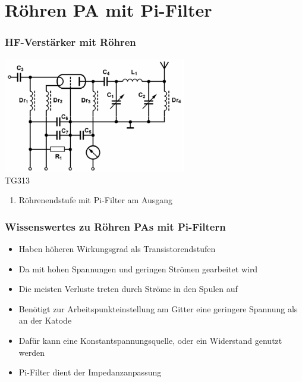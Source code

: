 

\subtitle{Technik A17: \\
           Schaltungstechnik \\[2em]}
\date{Stand 22.06.2015}


\section*{Röhren PA mit Pi-Filter}
\begin{frame}
    \frametitle{HF-Verstärker mit Röhren}
    \begin{center}
        \includegraphics[width=0.6\textwidth]{a17/TG313.png}\\
        \tiny TG313 \hyperlink{refs}{\cite{bna}}
     	\begin{enumerate} \Large
			\item Röhrenendstufe mit Pi-Filter am Ausgang
    	\end{enumerate}
    \end{center}
\end{frame}

\begin{frame}
\frametitle{Wissenswertes zu Röhren PAs mit Pi-Filtern}
\begin{center}
\begin{itemize}
	\item	Haben höheren Wirkungsgrad als Transistorendstufen
	\item	Da mit hohen Spannungen und geringen Strömen gearbeitet wird
	\item	Die meisten Verluste treten durch Ströme in den Spulen auf
	\item	Benötigt zur Arbeitspunkteinstellung am Gitter eine geringere Spannung als an der Katode
	\item	Dafür kann eine Konstantspannungsquelle, oder ein Widerstand genutzt werden
	\item	Pi-Filter dient der Impedanzanpassung
\end{itemize}
\end{center}
\end{frame}

